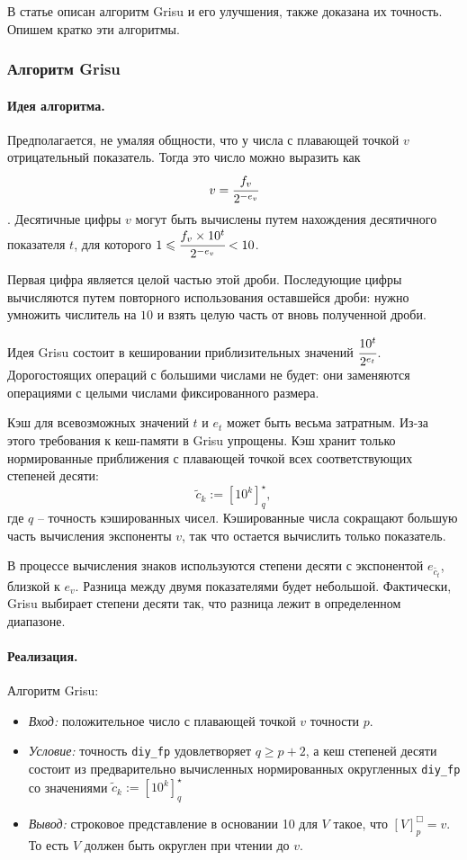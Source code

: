 \documentclass[specialist,subf,href,colorlinks=true,14pt
,times,mtpro,specialist
]{disser}
\begin{document}
В статье \cite{1} описан алгоритм \textsf{Grisu} и его улучшения, также доказана их точность.
Опишем кратко эти алгоритмы.
\subsubsection{Алгоритм \textsf{Grisu}}
\paragraph{Идея алгоритма.}
Предполагается, не умаляя общности, что у числа с плавающей точкой $v$ отрицательный показатель. 
Тогда это число можно выразить как $$v=\cfrac{f_v}{2^{-e_v}}$$. 
Десятичные цифры $v$ могут быть вычислены путем нахождения десятичного показателя $t$, для которого $1 \leqslant \cfrac{f_v \times 10^t}{2^{-e_v}} < 10$.

Первая цифра является целой частью этой дроби. 
Последующие цифры вычисляются путем повторного использования оставшейся дроби: нужно умножить числитель на $10$ и взять целую часть от вновь полученной дроби.

Идея \textsf{Grisu} состоит в кешировании приблизительных значений $\cfrac{10^t}{2^{e_t}}$.
Дорогостоящих операций с большими числами не будет: они заменяются операциями с целыми числами фиксированного размера.

Кэш для всевозможных значений $t$ и $e_t$ может быть весьма затратным. 
Из-за этого требования к кеш-памяти в \textsf{Grisu} упрощены. 
Кэш хранит только нормированные приближения с плавающей точкой всех соответствующих степеней десяти: $$\tilde{c}_k := \left[ 10^k \right]_q^{\star},$$ где $q$ -- точность кэшированных чисел.
Кэшированные числа сокращают большую часть вычисления экспоненты $v$, так что остается вычислить только показатель. 

В процессе вычисления знаков используются степени десяти с экспонентой $e_{\tilde{c_t}}$, близкой к $e_v$. 
Разница между двумя показателями будет небольшой.
Фактически, \textsf{Grisu} выбирает степени десяти так, что разница лежит в определенном диапазоне. 

\paragraph{Реализация.}
Алгоритм \textsf{Grisu}: \begin{itemize}
\item \textit{Вход:} положительное число с плавающей точкой $v$ точности $p$.
\item \textit{Условие:} точность \texttt{diy\_fp} удовлетворяет $q \geqslant p + 2$, а кеш степеней десяти состоит из предварительно вычисленных нормированных округленных  \texttt{diy\_fp} со значениями $\tilde{c}_k := \left[ 10^k \right]_q^{\star}$
\item \textit{Вывод:} строковое представление в основании 10 для $V$ такое, что $[V]^{\Box}_p = v$. 
То есть $V$ должен быть округлен при чтении до $v$.
\end{itemize}
\end{document}
